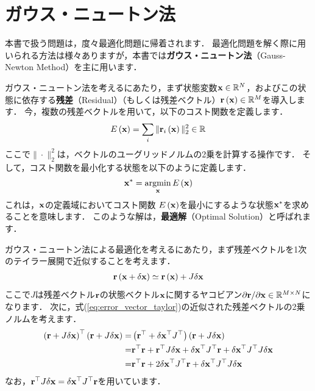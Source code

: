 \section{ガウス・ニュートン法}
\label{subsec:gauss-newton_method}

本書で扱う問題は，度々最適化問題に帰着されます．
最適化問題を解く際に用いられる方法は様々ありますが，本書では{\bf ガウス・ニュートン法}（Gauss-Newton Method）を主に用います．

ガウス・ニュートン法を考えるにあたり，まず状態変数${\bf x} \in \mathbb{R}^{N}$，およびこの状態に依存する{\bf 残差}（Residual）（もしくは残差ベクトル）${\bf r} \left( {\bf x} \right) \in \mathbb{R}^{M}$を導入します．
今，複数の残差ベクトルを用いて，以下のコスト関数を定義します．
%
\begin{align}
  E \left( {\bf x} \right) = \sum_{i} \| {\bf r}_{i} \left( {\bf x} \right) \|_{2}^{2} \in \mathbb{R}
\end{align}
%
ここで$\| \cdot \|_{2}^{2}$は，ベクトルのユーグリッドノルムの2乗を計算する操作です．
そして，コスト関数を最小化する状態を以下のように定義します．
%
\begin{align}
  {\bf x}^{*} = \mathop{\rm argmin}\limits_{ {\bf x} } E \left( {\bf x} \right)
\end{align}
%
これは，${\bf x}$の定義域においてコスト関数 $E \left( {\bf x} \right)$を最小にするような状態${\bf x}^{*}$を求めることを意味します．
このような解は，{\bf 最適解}（Optimal Solution）と呼ばれます．

ガウス・ニュートン法による最適化を考えるにあたり，まず残差ベクトルを1次のテイラー展開で近似することを考えます．
%
\begin{align}
  {\bf r} \left( {\bf x} + \delta {\bf x} \right) \simeq {\bf r} \left( {\bf x} \right) + J \delta {\bf x}
  \label{eq:error_vector_taylor}
\end{align}
%
ここで$J$は残差ベクトル${\bf r}$の状態ベクトル${\bf x}$に関するヤコビアン$\partial {\bf r} / \partial {\bf x} \in \mathbb{R}^{M \times N}$になります．
次に，式(\ref{eq:error_vector_taylor})の近似された残差ベクトルの2乗ノルムを考えます．
%
\begin{align}
  \begin{split}
    \left( {\bf r} + J \delta {\bf x} \right)^{\top} \left( {\bf r} + J \delta {\bf x} \right)
    = & \left( {\bf r}^{\top} + \delta {\bf x}^{\top} J^{\top} \right) \left( {\bf r} + J \delta {\bf x} \right) \\
    = & {\bf r}^{\top} {\bf r} + {\bf r}^{\top} J \delta {\bf x} + \delta {\bf x}^{\top} J^{\top} {\bf r} + \delta {\bf x}^{\top} J^{\top} J \delta {\bf x} \\
    = & {\bf r}^{\top} {\bf r} + 2 \delta {\bf x}^{\top} J^{\top} {\bf r} + \delta {\bf x}^{\top} J^{\top} J \delta {\bf x}
  \end{split}
  \label{eq:error_vector_taylor_sq_norm}
\end{align}
%
なお，${\bf r}^{\top} J \delta {\bf x} = \delta {\bf x}^{\top} J^{\top} {\bf r}$を用いています．

